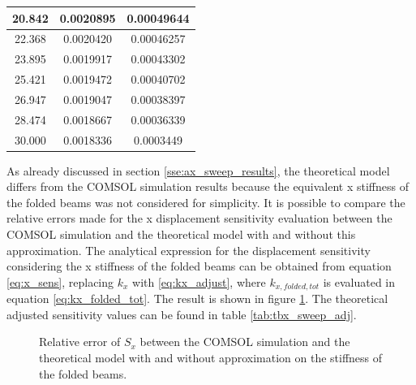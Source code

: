 \documentclass[lettersize,journal]{IEEEtran}
\begin{document}
\begin{table}[h]
\begin{tabular}{|c|c|c|}
            20.842       & 0.0020895     & 0.00049644                \\ \hline
            22.368       & 0.0020420     & 0.00046257               \\ \hline
            23.895       & 0.0019917     & 0.00043302               \\ \hline
            25.421       & 0.0019472     & 0.00040702               \\ \hline
            26.947       & 0.0019047     & 0.00038397               \\ \hline
            28.474       & 0.0018667     & 0.00036339               \\ \hline
            30.000       & 0.0018336     & 0.0003449               \\ \hline
        \end{tabular}
        \label{tab:tbx_sweep}
    \end{table}
    
    As already discussed in section \ref{sse:ax_sweep_results}, the theoretical model differs from the COMSOL simulation results because the equivalent x stiffness of the folded beams was not considered for simplicity. It is possible to compare the relative errors made for the x displacement sensitivity evaluation between the COMSOL simulation and the theoretical model with and without this approximation. The analytical expression for the displacement sensitivity considering the x stiffness of the folded beams can be obtained from equation \ref{eq:x_sens}, replacing \(k_x\) with \ref{eq:kx_adjust}, where \(k_{x,folded,tot}\) is evaluated in equation \ref{eq:kx_folded_tot}. The result is shown in figure \ref{plt:tbx_errors}. The theoretical adjusted sensitivity values can be found in table \ref{tab:tbx_sweep_adj}.
    
    \begin{figure}[!h]
        \centering
        
        \caption{Relative error of \(S_x\) between the COMSOL simulation and the theoretical model with and without approximation on the stiffness of the folded beams.}
        \label{plt:tbx_errors}
    \end{figure}
    
\end{document}
